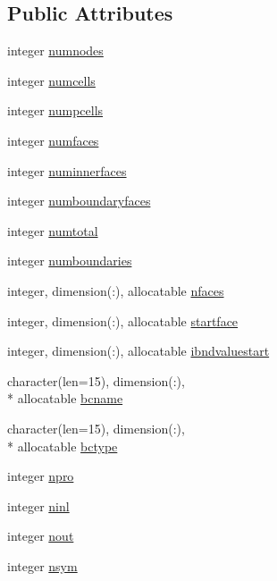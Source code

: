 \subsection*{Public Attributes}
\begin{DoxyCompactItemize}
\item 
integer \hyperlink{classgeometry_a74e7aa9e5207d1bdf0ec33642daa1e95}{numnodes}
\item 
integer \hyperlink{classgeometry_a6316b2c2a707e4250801749fad266b81}{numcells}
\item 
integer \hyperlink{classgeometry_abe73a7c15a5676edffcb997de320903b}{numpcells}
\item 
integer \hyperlink{classgeometry_a1fe23be4aa394d4647eb94f232ef7be4}{numfaces}
\item 
integer \hyperlink{classgeometry_a3604c4b943618f96d25b4e57be2d730a}{numinnerfaces}
\item 
integer \hyperlink{classgeometry_aa40b31eef33895463f82107dec14911a}{numboundaryfaces}
\item 
integer \hyperlink{classgeometry_a4b36c67fd5fbba66cd159331a6449464}{numtotal}
\item 
integer \hyperlink{classgeometry_a18cc0b968a1496fa99a2ef47a0ee7d1a}{numboundaries}
\item 
integer, dimension(\-:), allocatable \hyperlink{classgeometry_abc180e7f216d7319e972a77e754cf1ba}{nfaces}
\item 
integer, dimension(\-:), allocatable \hyperlink{classgeometry_a18f4eb284c2fb036786e7cb078b1261b}{startface}
\item 
integer, dimension(\-:), allocatable \hyperlink{classgeometry_ac725fa5c48485899cdc2607d4c0e3278}{ibndvaluestart}
\item 
character(len=15), dimension(\-:), \\*
allocatable \hyperlink{classgeometry_a4e43a18bec8fa1fa370aebdf28b26723}{bcname}
\item 
character(len=15), dimension(\-:), \\*
allocatable \hyperlink{classgeometry_a273882b8b9ef9670ecef4c22d7a1ffc3}{bctype}
\item 
integer \hyperlink{classgeometry_af9bcf0023987fb42899faea73e6e719d}{npro}
\item 
integer \hyperlink{classgeometry_a7c3a12b979532a42fd4791cd336b388f}{ninl}
\item 
integer \hyperlink{classgeometry_af185a2e42ce8dc5f660f52f4e844d883}{nout}
\item 
integer \hyperlink{classgeometry_a3267813953228bd94c67d73bd878eb9c}{nsym}

\end{DoxyCompactItemize}
